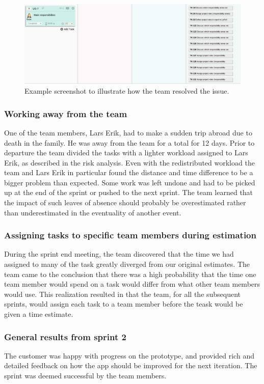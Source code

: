 \begin{figure}[H]
\includegraphics[width=\textwidth]{ch/devProcess/fig/addsTasks.png}
\caption{Example screenshot to illustrate how the team resolved the issue.}
\label{fig:addsTasks}
\end{figure}

\subsubsection{Working away from the team}
One of the team members, Lars Erik, had to make a sudden trip abroad due to
death in the family. He was away from the team for a total for 12 days. Prior
to departure the team divided the tasks with a lighter workload assigned to Lars
Erik, as described in the risk analysis. Even with the redistributed workload
the team and Lars Erik in particular found the distance and time difference to
be a bigger problem than expected. Some work was left undone and had to be
picked up at the end of the sprint or pushed to the next sprint. The team
learned that the impact of such leaves of absence should probably be
overestimated rather than underestimated in the eventuality of another event.

\subsubsection{Assigning tasks to specific team members during estimation}
\label{sec:assignEst}
During the sprint end meeting, the team discovered that the time we had assigned to many of the task greatly diverged from our original estimates. The team came to the conclusion that there was a high probability that the time one team member would spend on a task would differ from what other team members would use. This realization resulted in that the team, for all the subsequent sprints, would assign each task to a team member before the teask would be given a time estimate.

\subsubsection{General results from sprint 2} 
The customer was happy with progress on the prototype, and provided rich and detailed feedback on how the app should be improved for the next iteration. The sprint was deemed successful by the team members.
